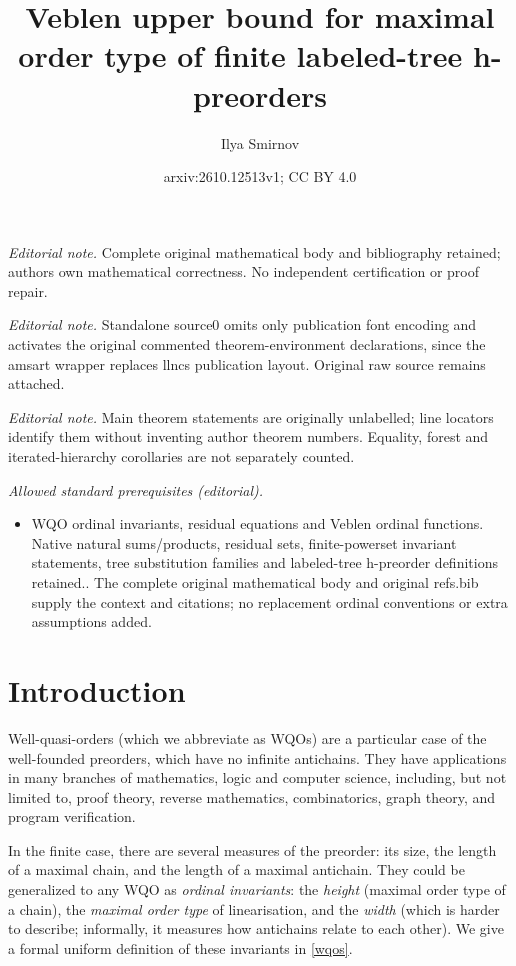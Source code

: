 \documentclass[10pt,a4paper]{amsart}
\title{Veblen upper bound for maximal order type of finite labeled-tree h-preorders}
\author{Ilya Smirnov}
\date{arxiv:2610.12513v1; CC BY 4.0}
\begin{document}
\maketitle
\noindent\textit{Editorial note.} Complete original mathematical body and bibliography retained; authors own mathematical correctness. No independent certification or proof repair.\par\medskip
\noindent\textit{Editorial note.} Standalone source0 omits only publication font encoding and activates the original commented theorem-environment declarations, since the amsart wrapper replaces llncs publication layout. Original raw source remains attached.\par\medskip
\noindent\textit{Editorial note.} Main theorem statements are originally unlabelled; line locators identify them without inventing author theorem numbers. Equality, forest and iterated-hierarchy corollaries are not separately counted.\par\medskip
\noindent\textit{Allowed standard prerequisites (editorial).}\begin{itemize}
\item WQO ordinal invariants, residual equations and Veblen ordinal functions. Native natural sums/products, residual sets, finite-powerset invariant statements, tree substitution families and labeled-tree h-preorder definitions retained.. The complete original mathematical body and original refs.bib supply the context and citations; no replacement ordinal conventions or extra assumptions added.
\end{itemize}\medskip
\section{Introduction}

Well-quasi-orders (which we abbreviate as WQOs) are a particular case of the well-founded preorders, which have no infinite antichains. They have applications in many branches of mathematics, logic and computer science, including, but not limited to, proof theory, reverse mathematics, combinatorics, graph theory, and program verification.

In the finite case, there are several measures of the preorder: its size, the length of a maximal chain, and the length of a maximal antichain. They could be generalized to any WQO as \textit{ordinal invariants}: the \textit{height} (maximal order type of a chain), the \textit{maximal order type} of linearisation, and the \textit{width} (which is harder to describe; informally, it measures how antichains relate to each other). We give a formal uniform definition of these invariants in \cref{wqos}.
\end{document}
